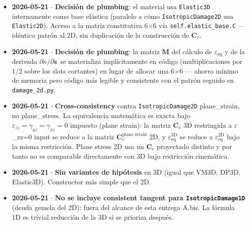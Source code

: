\documentclass[11pt,letterpaper,oneside]{report}
\begin{document}
\begin{itemize}
  \item \textbf{2026-05-21} \ensuremath{\cdot} \textbf{Decisión de plumbing}: el material usa \texttt{Elastic3D} internamente como base elástica (paralelo a cómo \texttt{IsotropicDamage2D} usa \texttt{Elastic2D}). Acceso a la matriz constitutiva 6\ensuremath{\times}6 vía \texttt{self.elastic\_base.C} --- idéntico patrón al 2D, sin duplicación de la construcción de $\mathbf C_e$.
\end{itemize}

\begin{itemize}
  \item \textbf{2026-05-21} \ensuremath{\cdot} \textbf{Decisión de plumbing}: la matriz $\mathbf M$ del cálculo de $\varepsilon_\text{eq}$ y de la derivada $\partial\kappa/\partial\boldsymbol\varepsilon$ se materializa implícitamente en código (multiplicaciones por $1/2$ sobre los slots cortantes) en lugar de allocar una 6\ensuremath{\times}6 --- ahorro mínimo de memoria pero código más legible y consistente con el patrón seguido en \texttt{damage\_2d.py}.
\end{itemize}

\begin{itemize}
  \item \textbf{2026-05-21} \ensuremath{\cdot} \textbf{Cross-consistency} contra \texttt{IsotropicDamage2D} plane\_strain, no plane\_stress. La equivalencia matemática es exacta bajo $\varepsilon_{zz} = \gamma_{yz} = \gamma_{xz} = 0$ impuesto (plane strain): la matriz $\mathbf C_e$ 3D restringida a \ensuremath{\varepsilon}\_zz=0 input se reduce a la matriz $\mathbf C_e^\text{plane strain}$ 2D, y $\varepsilon_\text{eq}^\text{3D}$ se reduce a $\varepsilon_\text{eq}^\text{2D}$ bajo la misma restricción. Plane stress 2D usa un $\mathbf C_e$ proyectado distinto y por tanto no es comparable directamente con 3D bajo restricción cinemática.
\end{itemize}

\begin{itemize}
  \item \textbf{2026-05-21} \ensuremath{\cdot} \textbf{Sin variantes de hipótesis} en 3D (igual que VM3D, DP3D, Elastic3D). Constructor más simple que el 2D.
\end{itemize}

\begin{itemize}
  \item \textbf{2026-05-21} \ensuremath{\cdot} \textbf{No se incluye consistent tangent para \texttt{IsotropicDamage1D}} (deuda gemela del 2D): fuera del alcance de esta entrega A.bis. La fórmula 1D es trivial reducción de la 3D si se prioriza después.
\end{itemize}
\end{document}
